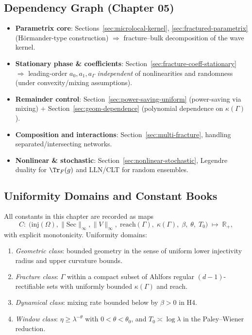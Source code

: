 \subsection{Dependency Graph (Chapter 05)}
\label{subsec:05-depgraph}
\begin{itemize}
  \item \textbf{Parametrix core}: Sections~\ref{sec:microlocal-kernel},
  \ref{sec:fractured-parametrix} (Hörmander-type construction)
  $\Rightarrow$ fracture–bulk decomposition of the wave kernel.
  \item \textbf{Stationary phase \& coefficients}: 
  Section~\ref{sec:fracture-coeff-stationary} 
  $\Rightarrow$ leading-order $a_0,a_1,a_\Gamma$ \emph{independent}
  of nonlinearities and randomness (under convexity/mixing assumptions).
  \item \textbf{Remainder control}: 
  Section~\ref{sec:power-saving-uniform} (power-saving via mixing)
  $+$ Section~\ref{sec:geom-dependence} (polynomial dependence on $\kappa(\Gamma)$).
  \item \textbf{Composition and interactions}: 
  Section~\ref{sec:multi-fracture}, handling separated/intersecting networks.
  \item \textbf{Nonlinear \& stochastic}: 
  Section~\ref{sec:nonlinear-stochastic}, Legendre duality for $\Tr_F(g)$
  and LLN/CLT for random ensembles.
\end{itemize}

\subsection{Uniformity Domains and Constant Books}
\label{subsec:05-constants}
All constants in this chapter are recorded as maps
\[
C:\; \big(\mathrm{inj}(\Omega), \|\mathrm{Sec}\|_\infty, \|V\|_\infty,\;
\mathrm{reach}(\Gamma),\;\kappa(\Gamma),\; \beta,\; \theta,\; T_0\big)\;\longmapsto\; \mathbb{R}_+,
\]
with explicit monotonicity. Uniformity domains:
\begin{enumerate}[label=(U\arabic*)]
  \item \emph{Geometric class}: bounded geometry in the sense of uniform
  lower injectivity radius and upper curvature bounds.
  \item \emph{Fracture class}: $\Gamma$ within a compact subset of Ahlfors regular
  $(d-1)$-rectifiable sets with uniformly bounded $\kappa(\Gamma)$ and reach.
  \item \emph{Dynamical class}: mixing rate bounded below by $\beta>0$ in H4.
  \item \emph{Window class}: $\eta\ge \lambda^{-\theta}$ with $0<\theta<\theta_0$,
  and $T_0 \asymp \log\lambda$ in the Paley–Wiener reduction.
\end{enumerate}


